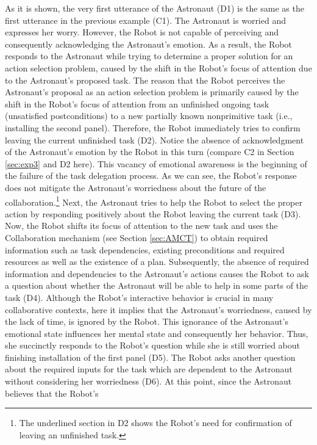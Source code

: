 As it is shown, the very first utterance of the Astronaut (D1) is the same as
the first utterance in the previous example (C1). The Astronaut is worried and
expresses her worry. However, the Robot is not capable of perceiving and
consequently acknowledging the Astronaut's emotion. As a result, the Robot
responds to the Astronaut while trying to determine a proper solution for an
action selection problem, caused by the shift in the Robot's focus of
attention due to the Astronaut's proposed task. The reason that the Robot
perceives the Astronaut's proposal as an action selection problem is primarily
caused by the shift in the Robot's focus of attention from an unfinished ongoing
task (unsatisfied postconditions) to a new partially known nonprimitive task
(i.e., installing the second panel). Therefore, the Robot immediately tries to
confirm leaving the current unfinished task (D2). Notice the absence of
acknowledgment of the Astronaut's emotion by the Robot in this turn (compare C2
in Section \ref{sec:exp3} and D2 here). This vacancy of emotional awareness is
the beginning of the failure of the task delegation process. As we can see, the
Robot's response does not mitigate the Astronaut's worriedness about the future
of the collaboration.\footnote{The underlined section in D2 shows the Robot's
need for confirmation of leaving an unfinished task.} Next, the Astronaut tries
to help the Robot to select the proper action by responding positively about the
Robot leaving the current task (D3). Now, the Robot shifts its focus of
attention to the new task and uses the Collaboration mechanism (see Section
\ref{sec:AMCT}) to obtain required information such as task dependencies,
existing preconditions and required resources as well as the existence of a
plan. Subsequently, the absence of required information and dependencies to the
Astronaut's actions causes the Robot to ask a question about whether the
Astronaut will be able to help in some parts of the task (D4). Although the
Robot's interactive behavior is crucial in many collaborative contexts, here it
implies that the Astronaut's worriedness, caused by the lack of time, is ignored
by the Robot. This ignorance of the Astronaut's emotional state influences her
mental state and consequently her behavior. Thus, she succinctly responds to the
Robot's question while she is still worried about finishing installation of the
first panel (D5). The Robot asks another question about the required inputs for
the task which are dependent to the Astronaut without considering her
worriedness (D6). At this point, since the Astronaut believes that the Robot's

